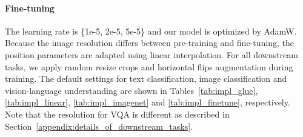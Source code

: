 \documentclass[11pt]{article}
\begin{document}
\paragraph{Fine-tuning}
The learning rate is  \{1e-5, 2e-5, 5e-5\} and our model is optimized by AdamW.
Because the image resolution differs between pre-training and fine-tuning, the position parameters are adapted using linear interpolation.
For all downstream tasks, we apply random resize crops and horizontal flips augmentation during training.
The default settings for text classification, image classification and vision-language understanding are shown in Tables~\ref{tab:impl_glue}, \ref{tab:impl_linear}, \ref{tab:impl_imagenet} and \ref{tab:impl_finetune}, respectively. Note that the resolution for VQA is different as described in Section~\ref{appendix:details_of_downstream_tasks}.


\begin{table}[ht]
\caption{Text classification: GLUE setting. 
\label{tab:impl_glue}}
\end{table}

\begin{table}[ht]
\caption{Image classification: Linear probing setting. 
\label{tab:impl_linear}}
\end{table}
\end{document}
